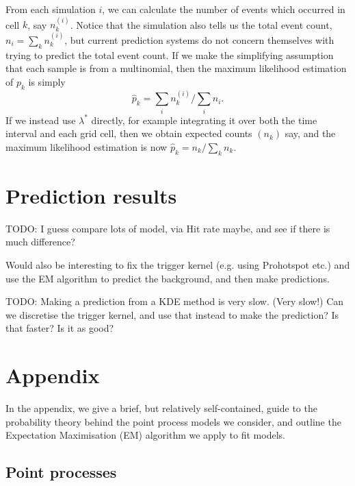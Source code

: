\documentclass[twoside,a4paper]{article}
\theoremstyle{plain}
\theoremstyle{definition}
\begin{document}
From each simulation $i$, we can calculate the number of events which occurred in cell $k$, say
$n_k^{(i)}$.  Notice that the simulation also tells us the total event count, $n_i=\sum_k n^{(i)}_k$,
but current prediction systems do not concern themselves with trying to predict the total
event count.  If we make the simplifying assumption that each sample is from a multinomial, then the
maximum likelihood estimation of $p_k$ is simply
\[ \hat p_k = \sum_i n_k^{(i)} / \sum_i n_i. \]
If we instead use $\lambda^*$ directly, for example integrating it over both the time interval and
each grid cell, then we obtain expected counts $(n_k)$ say, and the maximum likelihood estimation
is now $\hat p_k = n_k / \sum_k n_k$.

\section{Prediction results}

TODO: I guess compare lots of model, via Hit rate maybe, and see if there is much difference?

Would also be interesting to fix the trigger kernel (e.g. using Prohotspot etc.) and use
the EM algorithm to predict the background, and then make predictions.

TODO: Making a prediction from a KDE method is very slow. (Very slow!)  Can we discretise the trigger kernel, and use that instead to make the prediction?  Is that faster?  Is it as good?



\appendix
\section{Appendix}

In the appendix, we give a brief, but relatively self-contained, guide to the probability
theory behind the point process models we consider, and outline the Expectation
Maximisation (EM) algorithm we apply to fit models.


\subsection{Point processes}\label{app:pp}
\end{document}
